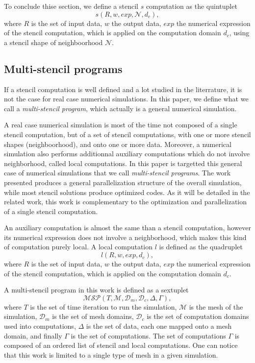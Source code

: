 To conclude thise section, we define a stencil $s$ computation as the quintuplet
\begin{equation*} 
s(R,w,exp,\mathcal{N},d_c),
\end{equation*}
where $R$ is the set of input data, $w$ the output data, $exp$ the numerical expression of the stencil computation, which is applied on the computation domain $d_c$, using a stencil shape of neighboorhood $\mathcal{N}$.

\subsection{Multi-stencil programs}
\label{sect:multistencil}
If a stencil computation is well defined and a lot studied in the literrature, it is not the case for real case numerical simulations. In this paper, we define what we call a \emph{multi-stencil program}, which actually is a general numerical simulation. 

A real case numerical simulation is most of the time not composed of a single stencil computation, but of a set of stencil computations, with one or more stencil shapes (neighboorhood), and onto one or more data. Moreover, a numerical simulation also performs additionnal auxiliary computations which do not involve neighborhood, called local computations. In this paper is targetted this general case of numerical simulations that we call \emph{multi-stencil programs}. The work presented produces a general parallelization structure of the overall simulation, while most stencil solutions produce optimized codes. As it will be detailed in the related work, this work is complementary to the optimization and parallelization of a single stencil computation.

An auxiliary computation is almost the same than a stencil computation, however its numerical expression does not involve a neighborhood, which makes this kind of computation purely local. A local computation $l$ is defined as the quadruplet
\begin{equation*} 
l(R,w,exp,d_c),
\end{equation*}
where $R$ is the set of input data, $w$ the output data, $exp$ the numerical expression of the stencil computation, which is applied on the computation domain $d_c$.

A multi-stencil program in this work is defined as a sextuplet
\begin{equation*} 
\mathcal{MSP}(T,\mathcal{M},\mathcal{D}_m,\mathcal{D}_c,\Delta,\Gamma),
\end{equation*}
where $T$ is the set of time iteration to run the simulation, $\mathcal{M}$ is the mesh of the simulation, $\mathcal{D}_m$ is the set of mesh domains, $\mathcal{D}_c$ is the set of computation domains used into computations, $\Delta$ is the set of data, each one mapped onto a mesh domain, and finally $\Gamma$ is the set of computations. The set of computations $\Gamma$ is composed of an ordered list of stencil and local computations. One can notice that this work is limited to a single type of mesh in a given simulation.

